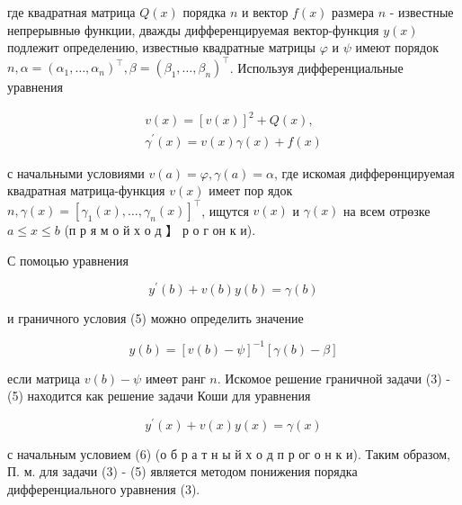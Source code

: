 \documentclass[10pt]{article}
\begin{document}
где квадратная матрица $Q(x)$ порядка $n$ и вектор $f(x)$ размера $n$ - известные непрерывныө функции, дважды дифференцируемая вектор-функция $y(x)$ подлежит определению, известныө квадратные матрицы $\varphi$ и $\psi$ имеют порядок $n, \alpha=\left(\alpha_{1}, \ldots, \alpha_{n}\right)^{\top}, \beta=\left(\beta_{1}, \ldots, \beta_{n}\right)^{\top}$. Используя дифференциальные уравнения



\[

\begin{gathered}

v(x)=[v(x)]^{2}+Q(x), \\

\gamma^{\prime}(x)=v(x) \gamma(x)+f(x)

\end{gathered}

\]



с начальными условиями $v(a)=\varphi, \gamma(a)=\alpha$, где искомая дифферөнцируемая квадратная матрица-функция $v(x)$ имеет пор ядок $n, \gamma(x)=\left[\gamma_{1}(x), \ldots, \gamma_{n}(x)\right]^{\top}$, ищутся $v(x)$ и $\gamma(x)$ на всем отрөзке $a \leqslant x \leqslant b$ (п р я м о й х о д 】 р о г он к и).



С помоцью уравнения



\[

y^{\prime}(b)+v(b) y(b)=\gamma(b)

\]



и граничного условия (5) можно определить значение



\[

y(b)=[v(b)-\psi]^{-1}[\gamma(b)-\beta]

\]



если матрица $v(b)-\psi$ имеөт ранг $n$. Искомое решение граничной задачи (3) - (5) находится как решение задачи Коши для уравнения



\[

y^{\prime}(x)+v(x) y(x)=\gamma(x)

\]



с начальным условием (6) (о б р а т н ы й х о д п р ог о н к и). Таким образом, П. м. для задачи (3) - (5) является методом понижения порядка дифференциального уравнения (3).
\end{document}
